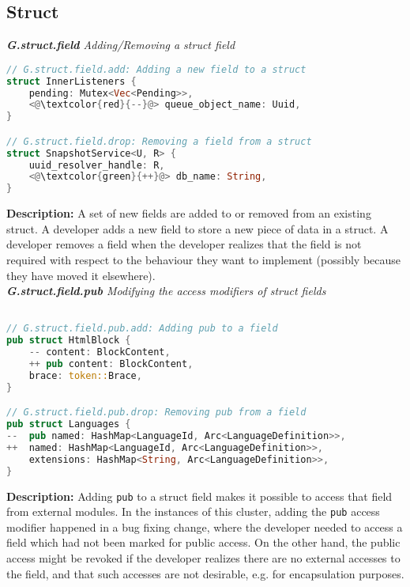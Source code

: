 \subsection{Struct} 
\noindent \textit{ \textbf{G.struct.field} Adding/Removing a struct field}

\begin{lstlisting}[language=Rust, style=colouredRust]
// G.struct.field.add: Adding a new field to a struct
struct InnerListeners {
    pending: Mutex<Vec<Pending>>,
    <@\textcolor{red}{--}@> queue_object_name: Uuid,
}

// G.struct.field.drop: Removing a field from a struct
struct SnapshotService<U, R> {
    uuid_resolver_handle: R,
    <@\textcolor{green}{++}@> db_name: String,
}
\end{lstlisting}

\noindent \textbf{Description:} A set of new fields are added to or removed from an existing struct. A developer adds a new field to store a new piece of data in a struct. A developer removes a field when the developer realizes that the field is not required with respect to the behaviour they want to implement (possibly because they have moved it elsewhere). \\

\noindent \textit{ \textbf{G.struct.field.pub} Modifying the access modifiers of struct fields}

\begin{lstlisting}[language=Rust, style=colouredRust]

// G.struct.field.pub.add: Adding pub to a field
pub struct HtmlBlock {
    -- content: BlockContent,
    ++ pub content: BlockContent,
    brace: token::Brace,
} 

// G.struct.field.pub.drop: Removing pub from a field
pub struct Languages {
--  pub named: HashMap<LanguageId, Arc<LanguageDefinition>>,
++  named: HashMap<LanguageId, Arc<LanguageDefinition>>,
    extensions: HashMap<String, Arc<LanguageDefinition>>,
}

\end{lstlisting}

\noindent \textbf{Description:} Adding \texttt{pub} to a struct field makes it possible to access that field from external modules. In the instances of this cluster, adding the \texttt{pub} access modifier happened in a bug fixing change, where the developer needed to access a field which had not been marked for public access. On the other hand, the public access might be revoked if the developer realizes there are no external accesses to the field, and that such accesses are not desirable, e.g. for encapsulation purposes.

